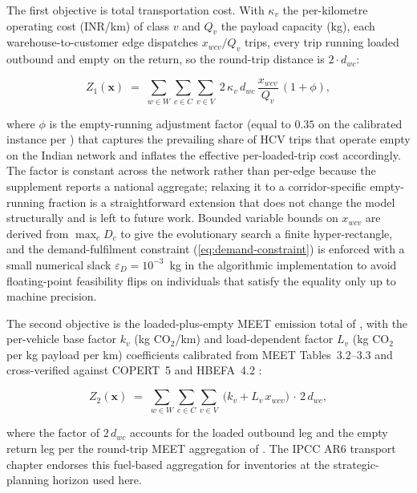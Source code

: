 \documentclass[review,preprint,authoryear,12pt]{elsarticle}
\newcommand{\COtwo}{\ensuremath{\mathrm{CO}_{2}}}
\begin{document}
The first objective is total transportation cost. With $\kappa_v$ the
per-kilometre operating cost (INR/km) of class $v$ and $Q_v$ the
payload capacity (kg), each warehouse-to-customer edge dispatches
$x_{wcv}/Q_v$ trips, every trip running loaded outbound and empty on
the return, so the round-trip distance is $2 \cdot d_{wc}$:

\begin{equation}
Z_1(\mathbf{x}) \;=\; \sum_{w \in W} \sum_{c \in C}
\sum_{v \in V} \;
2 \, \kappa_v \, d_{wc} \, \frac{x_{wcv}}{Q_v} \,
(1 + \phi),
\label{eq:cost-objective}
\end{equation}

where $\phi$ is the empty-running adjustment factor (equal to $0.35$
on the calibrated instance per \citet{niti_rmi_2021_freight}) that
captures the prevailing share of HCV trips that operate empty on the
Indian network and inflates the effective per-loaded-trip cost
accordingly. The factor is constant across the network rather than
per-edge because the supplement reports a national aggregate;
relaxing it to a corridor-specific empty-running fraction is a
straightforward extension that does not change the model
structurally and is left to future work. Bounded variable bounds on
$x_{wcv}$ are derived from $\max_c D_c$ to give the evolutionary
search a finite hyper-rectangle, and the demand-fulfilment constraint
(\ref{eq:demand-constraint}) is enforced with a small numerical
slack $\varepsilon_D = 10^{-3}$~kg in the algorithmic implementation
to avoid floating-point feasibility flips on individuals that satisfy
the equality only up to machine precision.

The second objective is the loaded-plus-empty MEET emission total of
\citet{hickman1999meet}, with the per-vehicle base factor $k_v$
(kg \COtwo{}/km) and load-dependent factor $L_v$ (kg \COtwo{} per kg
payload per km) coefficients calibrated from MEET Tables~3.2--3.3
and cross-verified against COPERT~5 \citep{copert5_2023} and
HBEFA~4.2 \citep{hbefa42_2022}:

\begin{equation}
Z_2(\mathbf{x}) \;=\; \sum_{w \in W} \sum_{c \in C}
\sum_{v \in V} \;
\bigl( k_v + L_v \, x_{wcv} \bigr) \,
\cdot \, 2 \, d_{wc},
\label{eq:emission-objective}
\end{equation}

where the factor of $2 \, d_{wc}$ accounts for the loaded outbound
leg and the empty return leg per the round-trip MEET aggregation of
\citet{bektas2011prp}. The IPCC AR6 transport chapter
\citep{ipcc2022ar6_transport} endorses this fuel-based aggregation
for inventories at the strategic-planning horizon used here.
\end{document}
